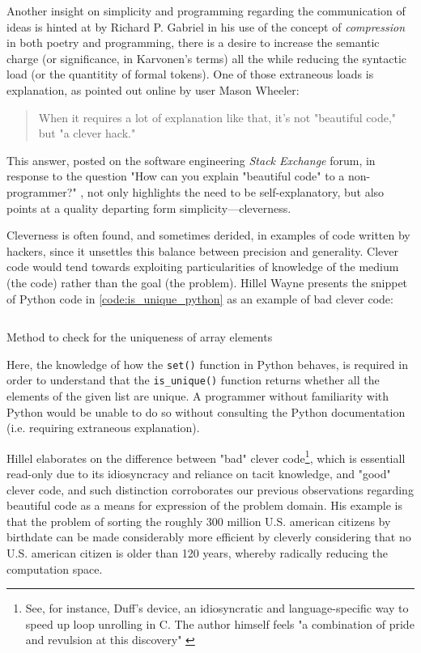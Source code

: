 Another insight on simplicity and programming regarding the communication of ideas is hinted at by Richard P. Gabriel in his use of the concept of \emph{compression} in both poetry and programming, there is a desire to increase the semantic charge (or significance, in Karvonen's terms) all the while reducing the syntactic load (or the quantitity of formal tokens). One of those extraneous loads is explanation, as pointed out online by user Mason Wheeler:

\begin{quote}
  When it requires a lot of explanation like that, it's not "beautiful code," but "a clever hack." \citep{stackoverflow_how_2013}
\end{quote}

This answer, posted on the software engineering \emph{Stack Exchange} forum, in response to the question "How can you explain "beautiful code" to a non-programmer?" \citep{stackoverflow_how_2013}, not only highlights the need to be self-explanatory, but also points at a quality departing form simplicity—cleverness.

Cleverness is often found, and sometimes derided, in examples of code written by hackers, since it unsettles this balance between precision and generality. Clever code would tend towards exploiting particularities of knowledge of the medium (the code) rather than the goal (the problem). Hillel Wayne presents the snippet of Python code in \ref{code:is_unique_python} as an example of bad clever code:

\begin{listing}
  \inputminted{python}{./corpus/unique.py}
  \caption{Method to check for the uniqueness of array elements}
  \label{code:is_unique_python}
\end{listing}

Here, the knowledge of how the \lstinline{set()} function in Python behaves, is required in order to understand that the \lstinline{is_unique()} function returns whether all the elements of the given list are unique. A programmer without familiarity with Python would be unable to do so without consulting the Python documentation (i.e. requiring extraneous explanation).

Hillel elaborates on the difference between "bad" clever code\footnote{See, for instance, Duff's device, an idiosyncratic and language-specific way to speed up loop unrolling in C. The author himself feels "a combination of pride and revulsion at this discovery" \citep{duff_tom_1983}}, which is essentiall read-only due to its idiosyncracy and reliance on tacit knowledge, and "good" clever code, and such distinction corroborates our previous observations regarding beautiful code as a means for expression of the problem domain. His example is that the problem of sorting the roughly 300 million U.S. american citizens by birthdate can be made considerably more efficient by cleverly considering that no U.S. american citizen is older than 120 years, whereby radically reducing the computation space.

